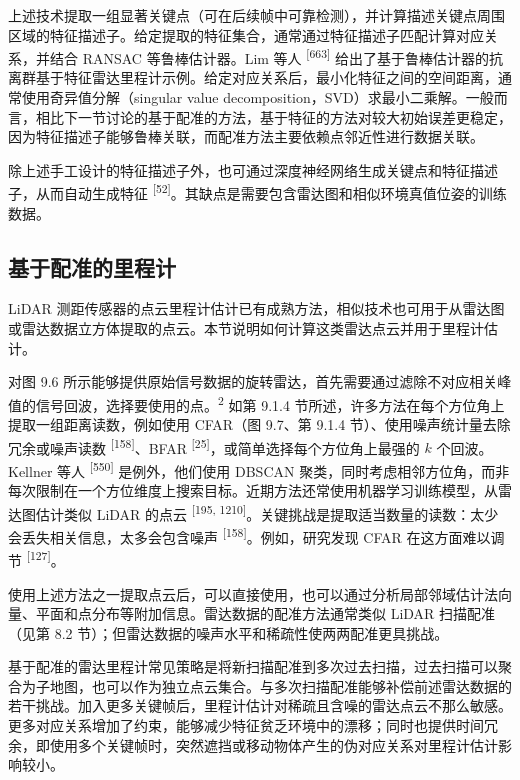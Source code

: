上述技术提取一组显著关键点（可在后续帧中可靠检测），并计算描述关键点周围区域的特征描述子。给定提取的特征集合，通常通过特征描述子匹配计算对应关系，并结合 RANSAC 等鲁棒估计器。Lim 等人 \textsuperscript{[663]} 给出了基于鲁棒估计器的抗离群基于特征雷达里程计示例。给定对应关系后，最小化特征之间的空间距离，通常使用奇异值分解（singular value decomposition，SVD）求最小二乘解。一般而言，相比下一节讨论的基于配准的方法，基于特征的方法对较大初始误差更稳定，因为特征描述子能够鲁棒关联，而配准方法主要依赖点邻近性进行数据关联。

除上述手工设计的特征描述子外，也可通过深度神经网络生成关键点和特征描述子，从而自动生成特征 \textsuperscript{[52]}。其缺点是需要包含雷达图和相似环境真值位姿的训练数据。

\subsection{基于配准的里程计}

LiDAR 测距传感器的点云里程计估计已有成熟方法，相似技术也可用于从雷达图或雷达数据立方体提取的点云。本节说明如何计算这类雷达点云并用于里程计估计。

对图 9.6 所示能够提供原始信号数据的旋转雷达，首先需要通过滤除不对应相关峰值的信号回波，选择要使用的点。\textsuperscript{2} 如第 9.1.4 节所述，许多方法在每个方位角上提取一组距离读数，例如使用 CFAR（图 9.7、第 9.1.4 节）、使用噪声统计量去除冗余或噪声读数 \textsuperscript{[158]}、BFAR \textsuperscript{[25]}，或简单选择每个方位角上最强的 $k$ 个回波。Kellner 等人 \textsuperscript{[550]} 是例外，他们使用 DBSCAN 聚类，同时考虑相邻方位角，而非每次限制在一个方位维度上搜索目标。近期方法还常使用机器学习训练模型，从雷达图估计类似 LiDAR 的点云 \textsuperscript{[195, 1210]}。关键挑战是提取适当数量的读数：太少会丢失相关信息，太多会包含噪声 \textsuperscript{[158]}。例如，研究发现 CFAR 在这方面难以调节 \textsuperscript{[127]}。

使用上述方法之一提取点云后，可以直接使用，也可以通过分析局部邻域估计法向量、平面和点分布等附加信息。雷达数据的配准方法通常类似 LiDAR 扫描配准（见第 8.2 节）；但雷达数据的噪声水平和稀疏性使两两配准更具挑战。

基于配准的雷达里程计常见策略是将新扫描配准到多次过去扫描，过去扫描可以聚合为子地图，也可以作为独立点云集合。与多次扫描配准能够补偿前述雷达数据的若干挑战。加入更多关键帧后，里程计估计对稀疏且含噪的雷达点云不那么敏感。更多对应关系增加了约束，能够减少特征贫乏环境中的漂移；同时也提供时间冗余，即使用多个关键帧时，突然遮挡或移动物体产生的伪对应关系对里程计估计影响较小。

